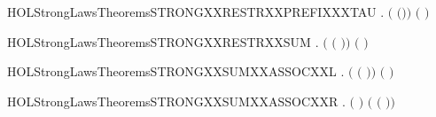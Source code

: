 \newcommand{\HOLStrongLawsTheoremsSTRONGXXRESTRXXPREFIXXXLABEL}{\UseVerbatim{HOLStrongLawsTheoremsSTRONGXXRESTRXXPREFIXXXLABEL}}
\begin{SaveVerbatim}{HOLStrongLawsTheoremsSTRONGXXRESTRXXPREFIXXXTAU}
\HOLTokenTurnstile{} \HOLSymConst{\HOLTokenForall{}} .  \ensuremath{(}  \ensuremath{(}\HOLConst{\ensuremath{\tau}}\HOLSymConst{\ensuremath{\ldotp}}\ensuremath{)}\ensuremath{)} \ensuremath{(}\HOLConst{\ensuremath{\tau}}\HOLSymConst{\ensuremath{\ldotp}}  \ensuremath{)}
\end{SaveVerbatim}
\newcommand{\HOLStrongLawsTheoremsSTRONGXXRESTRXXPREFIXXXTAU}{\UseVerbatim{HOLStrongLawsTheoremsSTRONGXXRESTRXXPREFIXXXTAU}}
\begin{SaveVerbatim}{HOLStrongLawsTheoremsSTRONGXXRESTRXXSUM}
\HOLTokenTurnstile{} \HOLSymConst{\HOLTokenForall{}}  .  \ensuremath{(}  \ensuremath{(} \HOLSymConst{\ensuremath{+}} \ensuremath{)}\ensuremath{)} \ensuremath{(}   \HOLSymConst{\ensuremath{+}}   \ensuremath{)}
\end{SaveVerbatim}
\newcommand{\HOLStrongLawsTheoremsSTRONGXXRESTRXXSUM}{\UseVerbatim{HOLStrongLawsTheoremsSTRONGXXRESTRXXSUM}}
\begin{SaveVerbatim}{HOLStrongLawsTheoremsSTRONGXXSUMXXASSOCXXL}
\HOLTokenTurnstile{} \HOLSymConst{\HOLTokenForall{}}  .  \ensuremath{(} \HOLSymConst{\ensuremath{+}} \ensuremath{(} \HOLSymConst{\ensuremath{+}} \ensuremath{)}\ensuremath{)} \ensuremath{(} \HOLSymConst{\ensuremath{+}}  \HOLSymConst{\ensuremath{+}} \ensuremath{)}
\end{SaveVerbatim}
\newcommand{\HOLStrongLawsTheoremsSTRONGXXSUMXXASSOCXXL}{\UseVerbatim{HOLStrongLawsTheoremsSTRONGXXSUMXXASSOCXXL}}
\begin{SaveVerbatim}{HOLStrongLawsTheoremsSTRONGXXSUMXXASSOCXXR}
\HOLTokenTurnstile{} \HOLSymConst{\HOLTokenForall{}}  .  \ensuremath{(} \HOLSymConst{\ensuremath{+}}  \HOLSymConst{\ensuremath{+}} \ensuremath{)} \ensuremath{(} \HOLSymConst{\ensuremath{+}} \ensuremath{(} \HOLSymConst{\ensuremath{+}} \ensuremath{)}\ensuremath{)}
\end{SaveVerbatim}
